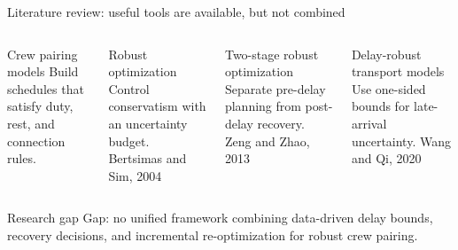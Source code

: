 \documentclass[aspectratio=169,11pt]{beamer}
\newcommand{\smallcite}[1]{\textcolor{polyublue}{\scriptsize #1}}
\begin{document}
\begin{frame}{Literature review: useful tools are available, but not combined}
  \begin{columns}[T,onlytextwidth]
      \begin{block}{Crew pairing models}
        Build schedules that satisfy duty, rest, and connection rules.
      \end{block}
      \begin{block}{Robust optimization}
        Control conservatism with an uncertainty budget. \smallcite{Bertsimas and Sim, 2004}
      \end{block}

      \begin{block}{Two-stage robust optimization}
        Separate pre-delay planning from post-delay recovery. \smallcite{Zeng and Zhao, 2013}
      \end{block}
      \begin{block}{Delay-robust transport models}
        Use one-sided bounds for late-arrival uncertainty. \smallcite{Wang and Qi, 2020}
      \end{block}
  \end{columns}

  \vspace{0.12cm}
  \begin{alertblock}{Research gap}
    Gap: no unified framework combining data-driven delay bounds, recovery decisions, and incremental re-optimization for robust crew pairing.
  \end{alertblock}
\end{frame}
\end{document}
